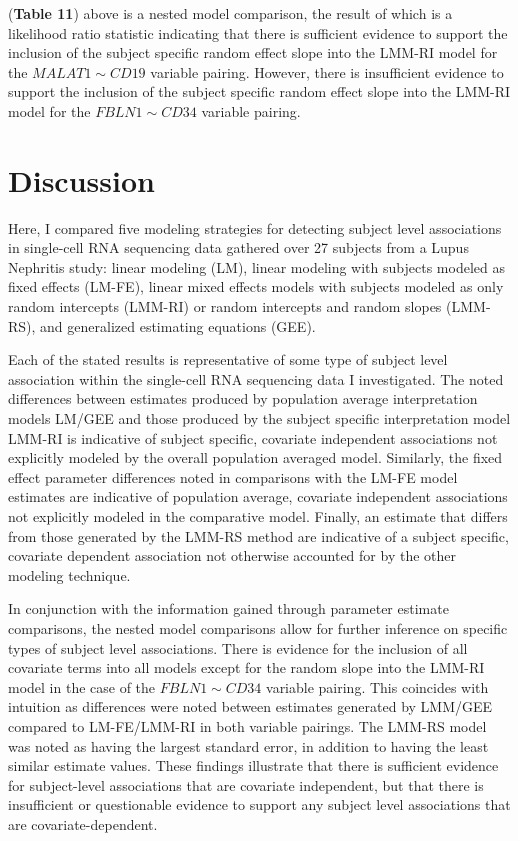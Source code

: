 \documentclass[12pt,]{article}
\begin{document}
(\textbf{Table 11}) above is a nested model comparison, the result of
which is a likelihood ratio statistic indicating that there is
sufficient evidence to support the inclusion of the subject specific
random effect slope into the LMM-RI model for the \(MALAT1 \sim CD19\)
variable pairing. However, there is insufficient evidence to support the
inclusion of the subject specific random effect slope into the LMM-RI
model for the \(FBLN1 \sim CD34\) variable pairing.

\hypertarget{discussion}{%
\section{Discussion}\label{discussion}}

Here, I compared five modeling strategies for detecting subject level
associations in single-cell RNA sequencing data gathered over 27
subjects from a Lupus Nephritis study: linear modeling (LM), linear
modeling with subjects modeled as fixed effects (LM-FE), linear mixed
effects models with subjects modeled as only random intercepts (LMM-RI)
or random intercepts and random slopes (LMM-RS), and generalized
estimating equations (GEE).

Each of the stated results is representative of some type of subject
level association within the single-cell RNA sequencing data I
investigated. The noted differences between estimates produced by
population average interpretation models LM/GEE and those produced by
the subject specific interpretation model LMM-RI is indicative of
subject specific, covariate independent associations not explicitly
modeled by the overall population averaged model. Similarly, the fixed
effect parameter differences noted in comparisons with the LM-FE model
estimates are indicative of population average, covariate independent
associations not explicitly modeled in the comparative model. Finally,
an estimate that differs from those generated by the LMM-RS method are
indicative of a subject specific, covariate dependent association not
otherwise accounted for by the other modeling technique.

In conjunction with the information gained through parameter estimate
comparisons, the nested model comparisons allow for further inference on
specific types of subject level associations. There is evidence for the
inclusion of all covariate terms into all models except for the random
slope into the LMM-RI model in the case of the \(FBLN1 \sim CD34\)
variable pairing. This coincides with intuition as differences were
noted between estimates generated by LMM/GEE compared to LM-FE/LMM-RI in
both variable pairings. The LMM-RS model was noted as having the largest
standard error, in addition to having the least similar estimate values.
These findings illustrate that there is sufficient evidence for
subject-level associations that are covariate independent, but that
there is insufficient or questionable evidence to support any subject
level associations that are covariate-dependent.
\end{document}
